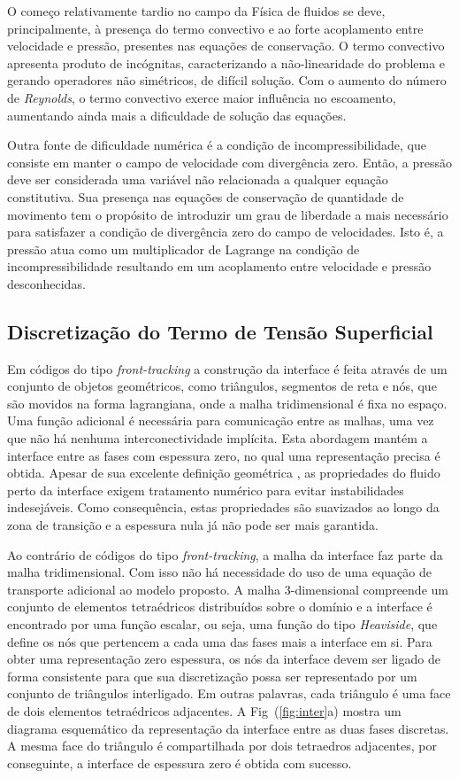 \documentclass[a4paper,portuges,12pt]{article}
\begin{document}
O começo relativamente tardio no campo da Física de fluidos se deve,
principalmente, à presença do termo convectivo e ao forte acoplamento
entre velocidade e pressão, presentes nas equações de conservação. O
termo convectivo apresenta produto de incógnitas, caracterizando a
não-linearidade do problema e gerando operadores não simétricos, de
difícil solução.  Com o aumento do número de \emph{Reynolds}, o termo
convectivo exerce maior influência no escoamento, aumentando ainda mais
a dificuldade de solução das equações.

Outra fonte de dificuldade numérica é a condição de incompressibilidade,
que consiste em manter o campo de velocidade com divergência zero.
Então, a pressão deve ser considerada uma variável não relacionada a
qualquer equação constitutiva.  Sua presença nas equações de conservação
de quantidade de movimento tem o propósito de introduzir um grau de
liberdade a mais necessário para satisfazer a condição de divergência
zero do campo de velocidades.  Isto é, a pressão atua como um
multiplicador de Lagrange na condição de incompressibilidade resultando
em um acoplamento entre velocidade e pressão desconhecidas.

\subsection{Discretização do Termo de Tensão Superficial}

Em códigos do tipo \textit{front-tracking} a construção da interface é feita
através de um conjunto de objetos geométricos, como triângulos,
segmentos de reta e nós, que são movidos na forma lagrangiana, onde a
malha tridimensional é fixa no espaço. Uma função adicional é necessária
para comunicação entre as malhas, uma vez que não há nenhuma
interconectividade implícita. Esta abordagem mantém a interface entre as
fases com espessura zero, no qual uma representação precisa é obtida.
Apesar de sua excelente definição geométrica , as propriedades do fluido
perto da interface exigem tratamento numérico para evitar instabilidades
indesejáveis. Como consequência, estas propriedades são suavizados ao
longo da zona de transição e a espessura nula já não pode ser mais
garantida.

Ao contrário de códigos do tipo \textit{front-tracking}, a malha da interface
faz parte da malha tridimensional. Com isso não há necessidade do uso de
uma equação de transporte adicional ao modelo proposto. A malha
3-dimensional compreende um conjunto de elementos tetraédricos
distribuídos sobre o domínio e a interface é encontrado por uma função
escalar, ou seja, uma função do tipo \textit{Heaviside}, que define os nós que
pertencem a cada uma das fases mais a interface em si. Para obter uma
representação zero espessura, os nós da interface devem ser ligado de
forma consistente para que sua discretização possa ser representado por
um conjunto de triângulos interligado. Em outras palavras, cada
triângulo é uma face de dois elementos tetraédricos adjacentes. A
Fig~(\ref{fig:inter}a) mostra um diagrama esquemático da
representação da interface entre as duas fases discretas. A mesma face
do triângulo é compartilhada por dois tetraedros adjacentes, por
conseguinte, a interface de espessura zero é obtida com sucesso.
\end{document}
